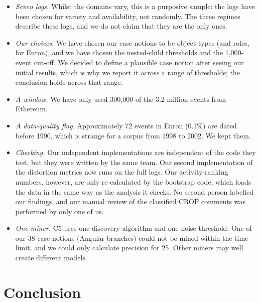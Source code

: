 \documentclass[pdflatex,sn-mathphys-num]{sn-jnl}
\begin{document}
\begin{itemize}
\item \emph{Seven logs.} Whilst the domains vary, this is a purposive sample: the logs have been chosen for variety and availability, not randomly. The three regimes describe these logs, and we do not claim that they are the only ones.
\item \emph{Our choices.} We have chosen our case notions to be object types (and roles, for Enron), and we have chosen the nested-child thresholds and the 1{,}000-event cut-off. We decided to define a plausible case notion after seeing our initial results, which is why we report it across a range of thresholds; the conclusion holds across that range.
\item \emph{A window.} We have only used 300{,}000 of the 3.2 million events from Ethereum.
\item \emph{A data-quality flag.} Approximately 72 events in Enron (0.1\%) are dated before 1990, which is strange for a corpus from 1998 to 2002. We kept them.
\item \emph{Checking.} Our independent implementations are independent of the code they test, but they were written by the same team. Our second implementation of the distortion metrics now runs on the full logs. Our activity-ranking numbers, however, are only re-calculated by the bootstrap code, which loads the data in the same way as the analysis it checks. No second person labelled our findings, and our manual review of the classified CROP comments was performed by only one of us.
\item \emph{One miner.} C5 uses one discovery algorithm and one noise threshold. One of our 38 case notions (Angular branches) could not be mined within the time limit, and we could only calculate precision for 25. Other miners may well create different models.
\end{itemize}

\section{Conclusion}\label{sec:conclusion}
\end{document}
